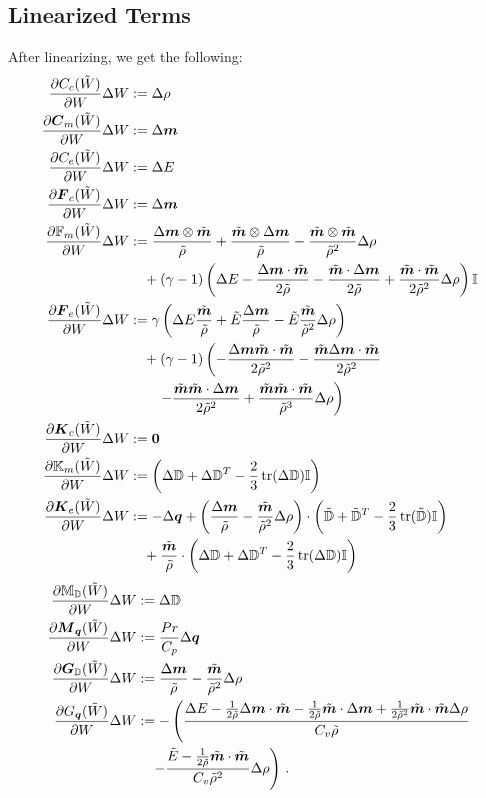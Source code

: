 \documentclass[Dissertation.tex]{subfiles}
\begin{document}
\subsection{Linearized Terms}
After linearizing, we get the following:
\begin{align*}
\frac{\partial C_c(\tilde W)}{\partial W}\Delta W&:=
	\Delta\rho\\
\frac{\partial\boldsymbol C_m(\tilde W)}{\partial W}\Delta W&:=
	\Delta\boldsymbol m\\
\frac{\partial C_e(\tilde W)}{\partial W}\Delta W&:=
	\Delta E\\
\frac{\partial\boldsymbol F_c(\tilde W)}{\partial W}\Delta W&:=
	\Delta\boldsymbol m\\
\frac{\partial\mathbb{F}_m(\tilde W)}{\partial W}\Delta W&:=
	\frac{\Delta\boldsymbol m\otimes\tilde{\boldsymbol m}}{\tilde\rho}
	+\frac{\tilde{\boldsymbol m}\otimes\Delta\boldsymbol m}{\tilde\rho}
	-\frac{\tilde{\boldsymbol m}\otimes\tilde{\boldsymbol m}}{\tilde\rho^2}\Delta\rho
	\\&\quad
	+(\gamma-1)\left( \Delta E
	-\frac{\Delta\boldsymbol m\cdot\tilde{\boldsymbol m}}{2\tilde\rho}
	-\frac{\tilde{\boldsymbol m}\cdot\Delta\boldsymbol m}{2\tilde\rho}
	+\frac{\tilde{\boldsymbol m}\cdot\tilde{\boldsymbol m}}{2\tilde\rho^2}\Delta\rho
	 \right)\mathbb{I}\\
\frac{\partial\boldsymbol F_e(\tilde W)}{\partial W}\Delta W&:=
	\gamma\left( 
	\Delta E\frac{\tilde{\boldsymbol m}}{\tilde\rho}
	+\tilde E\frac{\Delta\boldsymbol m}{\tilde\rho}
	-\tilde E\frac{\tilde{\boldsymbol m}}{\tilde\rho^2}\Delta\rho \right)
	\\&\quad
	+(\gamma-1)\left(
	-\frac{\Delta\boldsymbol m\tilde{\boldsymbol m}\cdot\tilde{\boldsymbol m}}{2\tilde\rho^2}
	-\frac{\tilde{\boldsymbol m}\Delta\boldsymbol m\cdot\tilde{\boldsymbol m}}{2\tilde\rho^2}
	\right.\\&\quad\quad\left.
	-\frac{\tilde{\boldsymbol m}\tilde{\boldsymbol m}\cdot\Delta\boldsymbol m}{2\tilde\rho^2}
	+\frac{\tilde{\boldsymbol m}\tilde{\boldsymbol m}\cdot\tilde{\boldsymbol m}}{\tilde\rho^3}\Delta\rho\right)\\
\frac{\partial\boldsymbol K_c(\tilde W)}{\partial W}\Delta W&:=
	\boldsymbol 0\\
\frac{\partial\mathbb{K}_m(\tilde W)}{\partial W}\Delta W&:=
	\left( \Delta\mathbb{D}+\Delta\mathbb{D}^T-\frac{2}{3}\operatorname*{tr}(\Delta\mathbb{D})\mathbb{I} \right)\\
\frac{\partial\boldsymbol K_e(\tilde W)}{\partial W}\Delta W&:=
	-\Delta\boldsymbol q+\left( \frac{\Delta\boldsymbol m}{\tilde\rho}-\frac{\tilde{\boldsymbol m}}{\tilde\rho^2}\Delta\rho \right)
	\cdot\left( \tilde{\mathbb{D}}+\tilde{\mathbb{D}}^T-\frac{2}{3}\operatorname*{tr}(\tilde{\mathbb{D}})\mathbb{I} \right)
	\\&\quad
	+\frac{\tilde{\boldsymbol m}}{\tilde\rho}\cdot\left( \Delta\mathbb{D}+\Delta\mathbb{D}^T-\frac{2}{3}\operatorname*{tr}(\Delta\mathbb{D})\mathbb{I} \right)\\
\end{align*}
\begin{align*}
\frac{\partial\mathbb{M}_{\mathbb{D}}(\tilde W)}{\partial W}\Delta W&:=
	\Delta\mathbb{D}\\
\frac{\partial\boldsymbol M_{\boldsymbol q}(\tilde W)}{\partial W}\Delta W&:=
	\frac{Pr}{C_p}\Delta\boldsymbol q\\
\frac{\partial\boldsymbol G_{\mathbb{D}}(\tilde W)}{\partial W}\Delta W&:=
	\frac{\Delta\boldsymbol m}{\tilde\rho}-\frac{\tilde{\boldsymbol m}}{\tilde\rho^2}\Delta\rho\\
\frac{\partial G_{\boldsymbol q}(\tilde W)}{\partial W}\Delta W&:=
	-\left(\frac{\Delta E-\frac{1}{2\tilde\rho}\Delta\boldsymbol m\cdot\tilde{\boldsymbol m}
	-\frac{1}{2\tilde\rho}\tilde{\boldsymbol m}\cdot\Delta\boldsymbol m
	+\frac{1}{2\tilde\rho^2}\tilde{\boldsymbol m}\cdot\tilde{\boldsymbol m}\Delta\rho}{C_v\tilde\rho}
	\right.\\&\quad\left.
	-\frac{\tilde E-\frac{1}{2\tilde\rho}\tilde{\boldsymbol m}\cdot\tilde{\boldsymbol m}}{C_v\tilde\rho^2}\Delta\rho\right)
\,.
\end{align*}
\end{document}
